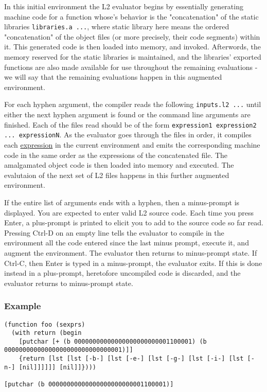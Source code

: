\documentclass[twocolumn,landscape]{article}
\begin{document}
    In this initial environment the L2 evaluator begins by essentially generating machine code for a function whose's behavior is the "concatenation" of the static libraries \lstinline{libraries.a ...}, where static library here means the ordered "concatenation" of the object files (or more precisely, their code segments) within it. This generated code is then loaded into memory, and invoked. Afterwords, the memory reserved for the static libraries is maintained, and the libraries' exported functions are also made available for use throughout the remaining evaluations - we will say that the remaining evaluations happen in this augmented environment.

    For each hyphen argument, the compiler reads the following \lstinline{inputs.l2 ...} until either the next hyphen argument is found or the command line arguments are finished. Each of the files read should be of the form \lstinline{expression1 expression2 ... expressionN}. As the evaluator goes through the files in order, it compiles each \hyperref[sec:expression]{expression} in the current environment and emits the corresponding machine code in the same order as the expressions of the concatenated file. The amalgamated object code is then loaded into memory and executed. The evalutaion of the next set of L2 files happens in this further augmented environment.

    If the entire list of arguments ends with a hyphen, then a minus-prompt is displayed. You are expected to enter valid L2 source code. Each time you press Enter, a plus-prompt is printed to elicit you to add to the source code so far read. Pressing Ctrl-D on an empty line tells the evaluator to compile in the environment all the code entered since the last minus prompt, execute it, and augment the environment. The evaluator then returns to minus-prompt state. If Ctrl-C, then Enter is typed in a minus-prompt, the evaluator exits. If this is done instead in a plus-prompt, heretofore uncompiled code is discarded, and the evaluator returns to minus-prompt state.

    \subsubsection{Example}\label{sec:example}
      \begin{lstlisting}[caption={file1.l2}]
(function foo (sexprs)
  (with return (begin
    [putchar [+ (b 00000000000000000000000001100001) (b 00000000000000000000000000000001)]]
    {return [lst [lst [-b-] [lst [-e-] [lst [-g-] [lst [-i-] [lst [-n-] [nil]]]]]] [nil]]})))

[putchar (b 00000000000000000000000001100001)]
      \end{lstlisting}
      
\end{document}
